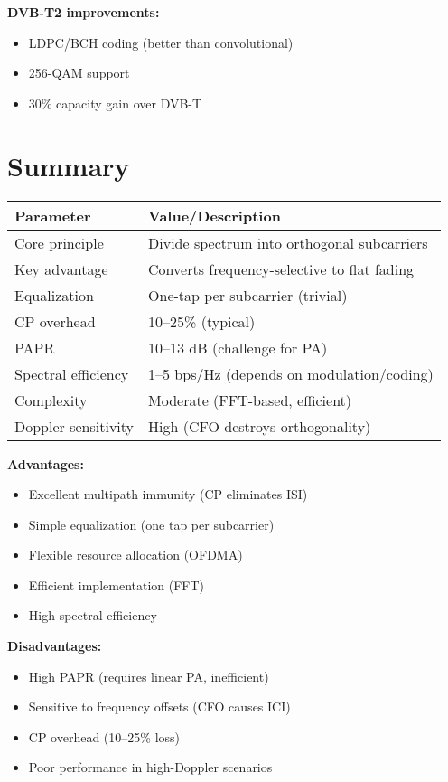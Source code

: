 \textbf{DVB-T2 improvements:}
\begin{itemize}
\item LDPC/BCH coding (better than convolutional)
\item 256-QAM support
\item 30\% capacity gain over DVB-T
\end{itemize}

\section{Summary}

\begin{center}
\begin{tabular}{@{}ll@{}}
\toprule
\textbf{Parameter} & \textbf{Value/Description} \\
\midrule
Core principle & Divide spectrum into orthogonal subcarriers \\
Key advantage & Converts frequency-selective to flat fading \\
Equalization & One-tap per subcarrier (trivial) \\
CP overhead & 10--25\% (typical) \\
PAPR & 10--13 dB (challenge for PA) \\
Spectral efficiency & 1--5 bps/Hz (depends on modulation/coding) \\
Complexity & Moderate (FFT-based, efficient) \\
Doppler sensitivity & High (CFO destroys orthogonality) \\
\bottomrule
\end{tabular}
\end{center}

\textbf{Advantages:}
\begin{itemize}
\item[\checkmark] Excellent multipath immunity (CP eliminates ISI)
\item[\checkmark] Simple equalization (one tap per subcarrier)
\item[\checkmark] Flexible resource allocation (OFDMA)
\item[\checkmark] Efficient implementation (FFT)
\item[\checkmark] High spectral efficiency
\end{itemize}

\textbf{Disadvantages:}
\begin{itemize}
\item[\texttimes] High PAPR (requires linear PA, inefficient)
\item[\texttimes] Sensitive to frequency offsets (CFO causes ICI)
\item[\texttimes] CP overhead (10--25\% loss)
\item[\texttimes] Poor performance in high-Doppler scenarios
\end{itemize}

